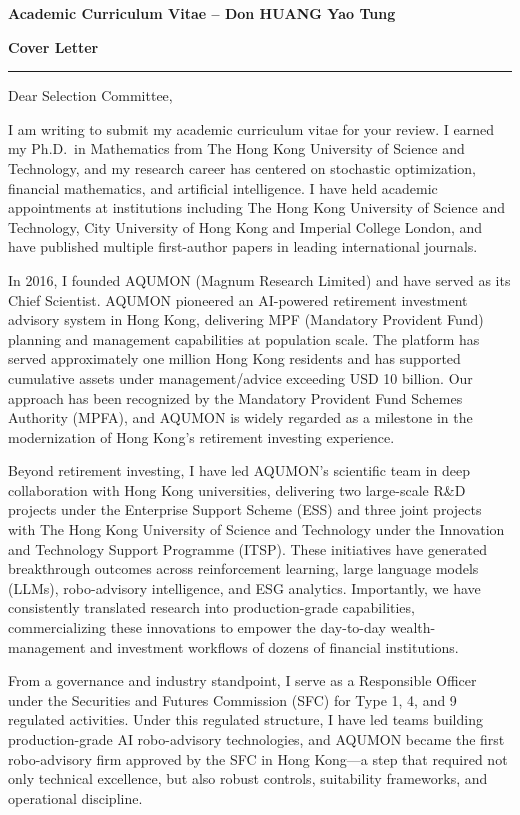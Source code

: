 \documentclass[11pt]{article}
\newcommand{\CVSection}[1]{\vspace{6pt}\textbf{\large #1}\par\vspace{2pt}\hrule\vspace{6pt}}
\newcommand{\TargetCommittee}{Selection Committee}
\begin{document}
\begin{center}
{\LARGE \textbf{Academic Curriculum Vitae -- Don HUANG Yao Tung}}\\[4pt]
\end{center}

\CVSection{Cover Letter}

Dear \TargetCommittee,

I am writing to submit my academic curriculum vitae for your review. I earned my Ph.D.\ in Mathematics from The Hong Kong University of Science and Technology, and my research career has centered on stochastic optimization, financial mathematics, and artificial intelligence. I have held academic appointments at institutions including The Hong Kong University of Science and Technology, City University of Hong Kong and Imperial College London, and have published multiple first-author papers in leading international journals.

In 2016, I founded AQUMON (Magnum Research Limited) and have served as its Chief Scientist. AQUMON pioneered an AI-powered retirement investment advisory system in Hong Kong, delivering MPF (Mandatory Provident Fund) planning and management capabilities at population scale. The platform has served approximately one million Hong Kong residents and has supported cumulative assets under management/advice exceeding USD 10 billion. Our approach has been recognized by the Mandatory Provident Fund Schemes Authority (MPFA), and AQUMON is widely regarded as a milestone in the modernization of Hong Kong’s retirement investing experience.

Beyond retirement investing, I have led AQUMON’s scientific team in deep collaboration with Hong Kong universities, delivering two large-scale R\&D projects under the Enterprise Support Scheme (ESS) and three joint projects with The Hong Kong University of Science and Technology under the Innovation and Technology Support Programme (ITSP). These initiatives have generated breakthrough outcomes across reinforcement learning, large language models (LLMs), robo-advisory intelligence, and ESG analytics. Importantly, we have consistently translated research into production-grade capabilities, commercializing these innovations to empower the day-to-day wealth-management and investment workflows of dozens of financial institutions.


From a governance and industry standpoint, I serve as a Responsible Officer under the Securities and Futures Commission (SFC) for Type 1, 4, and 9 regulated activities. Under this regulated structure, I have led teams building production-grade AI robo-advisory technologies, and AQUMON became the first robo-advisory firm approved by the SFC in Hong Kong---a step that required not only technical excellence, but also robust controls, suitability frameworks, and operational discipline.
\end{document}
